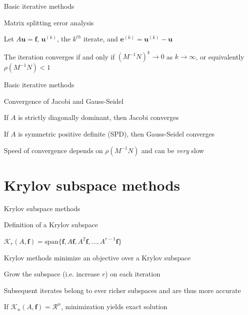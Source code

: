 \documentclass[18pt,xcolor=table]{beamer}
\begin{document}
\begin{frame}{Basic iterative methods}
\begin{block}{Matrix splitting error analysis}
\bit
\item Let $A\mathbf{u} = \mathbf{f}$, $\mathbf{u}^{(k)}$, the $k^{th}$ iterate, and $\mathbf{e}^{(k)} = \mathbf{u}^{(k)} - \mathbf{u}$
\eit
{}
\bit
\item The iteration converges if and only if $(M^{-1}N)^k \rightarrow 0$ as $k\rightarrow \infty$, or equivalently $\rho (M^{-1}N) < 1$
\eit
\end{block}
\end{frame}

\begin{frame}{Basic iterative methods}
\begin{block}{Convergence of Jacobi and Gauss-Seidel}
\bit
\item If $A$ is strictly diagonally dominant, then Jacobi converges
\item If $A$ is symmetric positive definite (SPD), then Gauss-Seidel converges
\item Speed of convergence depends on $\rho (M^{-1}N)$ and can be \emph{very} slow
\eit
\end{block}
\end{frame}



\section{Krylov subspace methods}

\begin{frame}{Krylov subspace methods}
\begin{block}{Definition of a Krylov subspace}
\bit
\item $\mathcal{K}_r(A,\mathbf{f}) = \text{span}\{\mathbf{f},A\mathbf{f},A^2\mathbf{f},...,A^{r-1}\mathbf{f}\}$
\item Krylov methods minimize an objective over a Krylov subspace
\item Grow the subspace (i.e. increase $r$) on each iteration
\item Subsequent iterates belong to ever richer subspaces and are thus more accurate
\item If $\mathcal{K}_n(A,\mathbf{f}) = \mathcal{R}^n$, minimization yields exact solution
\eit
\end{block}
\end{frame}
\end{document}
